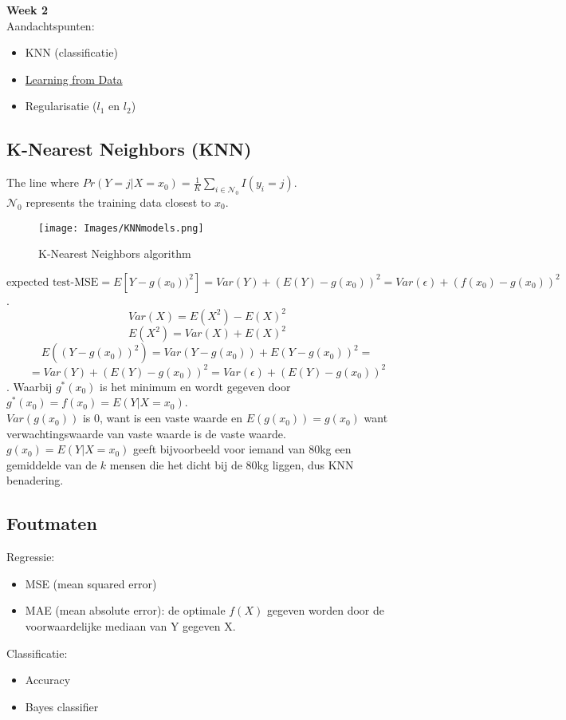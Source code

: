{\large
\textbf{{\LARGE Week 2}}\\
Aandachtspunten:
\begin{itemize}
    \item KNN (classificatie)
    \item \href{https://work.caltech.edu/telecourse}{Learning from Data}
    \item Regularisatie ($l_1$ en  $l_2$)
\end{itemize}
\subsection{K-Nearest Neighbors (KNN)}
The line where $Pr(Y=j|X=x_0)=\frac{1}{K}\sum\limits_{i\in\mathcal{N}_0}I(y_i=j)$.\\
$\mathcal{N}_0$ represents the training data closest to $x_0$.\\

\begin{figure}[h]
    \centering
    \texttt{[image: Images/KNNmodels.png]}
    \caption{K-Nearest Neighbors algorithm}
    \label{fig:knn}
\end{figure}

\[\textrm{expected test-MSE} = E[Y-g(x_0))^2]=Var(Y)+(E(Y)-g(x_0))^2=Var(\epsilon)+(f(x_0)-g(x_0))^2\].
\[Var(X)=E(X^2)-E(X)^2\]
\[E(X^2)=Var(X)+E(X)^2\]
\[E((Y-g(x_0))^2)=Var(Y-g(x_0))+E(Y-g(x_0))^2=\]
\[=Var(Y)+(E(Y)-g(x_0))^2=Var(\epsilon)+(E(Y)-g(x_0))^2\].\vspace{2mm}
Waarbij $g^*(x_0)$ is het minimum en wordt gegeven door $g^*(x_0)=f(x_0)=E(Y|X=x_0)$.\vspace{2mm}\\
$Var(g(x_0))$ is 0, want is een vaste waarde en $E(g(x_0))=g(x_0)$ want verwachtingswaarde van vaste waarde is de vaste waarde.\\
$g(x_0)=E(Y|X=x_0)$ geeft bijvoorbeeld voor iemand van 80kg een gemiddelde van de $k$ mensen die het dicht bij de 80kg liggen, dus KNN benadering.

\subsection{Foutmaten}
Regressie:
\begin{itemize}
    \item MSE (mean squared error)
    \item MAE (mean absolute error): de optimale $f(X)$ gegeven worden door de voorwaardelijke mediaan van Y gegeven X. 
\end{itemize}
\noindent Classificatie:
\begin{itemize}
    \item Accuracy
    \item Bayes classifier
\end{itemize}
}
